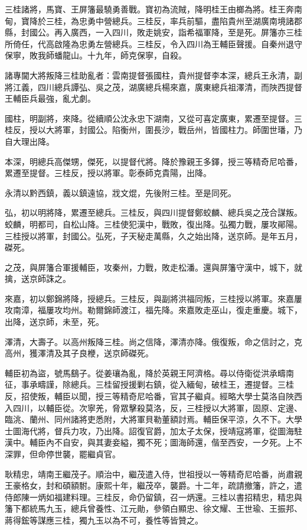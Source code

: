 \begin{pinyinscope}
三桂諸將，馬寶、王屏籓最驍勇善戰。寶初為流賊，降明桂王由榔為將。桂王奔南甸，寶降於三桂，為忠勇中營總兵。三桂反，率兵前驅，盡陷貴州至湖廣南境諸郡縣，封國公。再入廣西，一入四川，敗走姚安，詣希福軍降，至是死。屏籓亦三桂所倚任，代高啟隆為忠勇左營總兵。三桂反，令入四川為王輔臣聲援。自秦州退守保寧，敗我師蟠龍山。十九年，師克保寧，自殺。

諸專閫大將叛降三桂助亂者：雲南提督張國柱，貴州提督李本深，總兵王永清，副將江義，四川總兵譚弘、吳之茂，湖廣總兵楊來嘉，廣東總兵祖澤清，而陜西提督王輔臣兵最強，亂尤劇。

國柱，明副將，來降。從續順公沈永忠下湖南，又從可喜定廣東，累遷至提督。三桂反，授以大將軍，封國公。陷衡州，圍長沙，戰岳州，皆國柱力。師圍世璠，乃自大理出降。

本深，明總兵高傑甥，傑死，以提督代將。降於豫親王多鐸，授三等精奇尼哈番，累遷至提督。三桂反，授以將軍。彰泰師克貴陽，出降。

永清以黔西鎮，義以鎮遠協，戕文焜，先後附三桂。至是同死。

弘，初以明將降，累遷至總兵。三桂反，與四川提督鄭蛟麟、總兵吳之茂合謀叛。蛟麟，明都司，自松山降。三桂使犯漢中，戰敗，復出降。弘獨力戰，屢攻鄖陽。三桂授以將軍，封國公。弘死，子天秘走萬縣，久之始出降，送京師。是年五月，磔死。

之茂，與屏籓合軍援輔臣，攻秦州，力戰，敗走松潘。還與屏籓守漢中，城下，就擒，送京師誅之。

來嘉，初以鄭錦將降，授總兵。三桂反，與副將洪福同叛，三桂授以將軍。來嘉屢攻南漳，福屢攻均州。勒爾錦師渡江，福先降。來嘉敗走巫山，復走重慶。城下，出降，送京師，未至，死。

澤清，大壽子。以高州叛降三桂。尚之信降，澤清亦降。俄復叛，命之信討之，克高州，獲澤清及其子良楩，送京師磔死。

輔臣初為盜，號馬鷂子。從姜瓖為亂，降於英親王阿濟格。尋以侍衛從洪承疇南征，事承疇謹，除總兵。三桂留授援剿右鎮，從入緬甸，破桂王，遷提督。三桂反，招使叛，輔臣以聞，授三等精奇尼哈番，官其子繼貞。經略大學士莫洛自陜西入四川，以輔臣從。次寧羌，脅眾擊殺莫洛，反，三桂授以大將軍，固原、定邊、臨洮、蘭州、同州諸將吏悉附，大將軍貝勒董額討焉。輔臣保平涼，久不下。大學士圖海代將，督兵力攻，乃出降。詔復官爵，加太子太保，授靖寇將軍，從圖海駐漢中。輔臣內不自安，與其妻妾縊，獨不死；圖海師還，偕至西安，一夕死。上不深罪，但命停世襲，罷繼貞官。

耿精忠，靖南王繼茂子。順治中，繼茂遣入侍，世祖授以一等精奇尼哈番，尚肅親王豪格女，封和碩額駙。康熙十年，繼茂卒，襲爵。十二年，疏請撤籓，許之，遣侍郎陳一炳如福建料理。三桂反，命仍留鎮，召一炳還。三桂以書招精忠，精忠與籓下都統馬九玉，總兵曾養性、江元勛，參領白顯忠、徐文耀、王世瑜、王振邦、蔣得鋐等謀應三桂，獨九玉以為不可，養性等皆贊之。


\end{pinyinscope}
